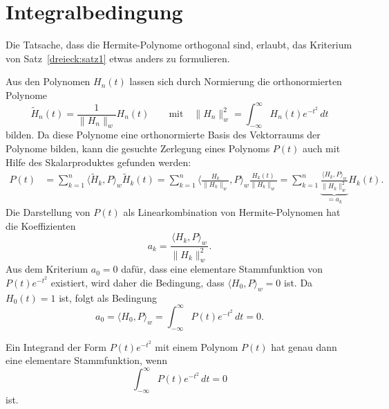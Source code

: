 %
%
%
\section{Integralbedingung
\label{dreieck:section:integralbedingung}}
Die Tatsache, dass die Hermite-Polynome orthogonal sind, erlaubt, das
Kriterium von Satz~\ref{dreieck:satz1} etwas anders zu formulieren.

Aus den Polynomen $H_n(t)$ lassen sich durch Normierung die
orthonormierten Polynome
\[
\tilde{H}_n(t)
=
\frac{1}{\| H_n\|_w} H_n(t)
\qquad\text{mit}\quad
\|H_n\|_w^2
=
\int_{-\infty}^\infty H_n(t)e^{-t^2}\,dt
\]
bilden.
Da diese Polynome eine orthonormierte Basis des Vektorraums der Polynome
bilden, kann die gesuchte Zerlegung eines Polynoms $P(t)$ auch mit
Hilfe des Skalarproduktes gefunden werden:
\begin{align*}
P(t)
&=
\sum_{k=1}^n
\langle \tilde{H}_k, P\rangle_w
\tilde{H}_k(t)
=
\sum_{k=1}^n
\biggl\langle \frac{H_k}{\|H_k\|_w}, P\biggr\rangle_w
\frac{H_k(t)}{\|H_k\|_w}
=
\sum_{k=1}^n
\underbrace{
\frac{ \langle H_k, P\rangle_w }{\|H_k\|_w^2}
}_{\displaystyle =a_k}
H_k(t).
\end{align*}
Die Darstellung von $P(t)$ als Linearkombination von Hermite-Polynomen
hat die Koeffizienten
\[
a_k = \frac{\langle H_k,P\rangle_w}{\|H_k\|_w^2}.
\]
Aus dem Kriterium $a_0=0$ dafür, dass eine elementare Stammfunktion
von $P(t)e^{-t^2}$ existiert, wird daher die Bedingung, dass
$\langle H_0,P\rangle_w=0$ ist.
Da $H_0(t)=1$ ist, folgt als Bedingung
\[
a_0
=
\langle H_0,P\rangle_w
=
\int_{-\infty}^\infty P(t) e^{-t^2}\,dt
=
0.
\]

\begin{satz}
Ein Integrand der Form $P(t)e^{-t^2}$ mit einem Polynom $P(t)$
hat genau dann eine elementare Stammfunktion, wenn
\[
\int_{-\infty}^\infty P(t)e^{-t^2}\,dt = 0
\]
ist.
\end{satz}




